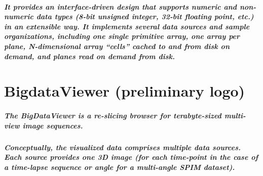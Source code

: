 \documentclass[
  letterpaper,
  DIV=11,
  numbers=noendperiod]{scrartcl}
\let\oldsubparagraph\subparagraph
\renewcommand{\subparagraph}[1]{\oldsubparagraph{#1}\mbox{}}
\begin{document}
\hypertarget{it-provides-an-interface-driven-design-that-supports-numeric-and-non-numeric-data-types-8-bit-unsigned-integer-32-bit-floating-point-etc.-in-an-extensible-way.-it-implements-several-data-sources-and-sample-organizations-including-one-single-primitive-array-one-array-per-plane-n-dimensional-array-cells-cached-to-and-from-disk-on-demand-and-planes-read-on-demand-from-disk.}{%
\subparagraph{It provides an interface-driven design that supports
numeric and non-numeric data types (8-bit unsigned integer, 32-bit
floating point, etc.) in an extensible way. It implements several data
sources and sample organizations, including one single primitive array,
one array per plane, N-dimensional array ``cells'' cached to and from
disk on demand, and planes read on demand from
disk.}\label{it-provides-an-interface-driven-design-that-supports-numeric-and-non-numeric-data-types-8-bit-unsigned-integer-32-bit-floating-point-etc.-in-an-extensible-way.-it-implements-several-data-sources-and-sample-organizations-including-one-single-primitive-array-one-array-per-plane-n-dimensional-array-cells-cached-to-and-from-disk-on-demand-and-planes-read-on-demand-from-disk.}}

\hypertarget{bigdataviewer-preliminary-logo}{%
\section{BigdataViewer (preliminary
logo)}\label{bigdataviewer-preliminary-logo}}

\hypertarget{the-bigdataviewer-is-a-re-slicing-browser-for-terabyte-sized-multi-view-image-sequences.}{%
\subparagraph{The BigDataViewer is a re-slicing browser for
terabyte-sized multi-view image
sequences.}\label{the-bigdataviewer-is-a-re-slicing-browser-for-terabyte-sized-multi-view-image-sequences.}}

\hypertarget{conceptually-the-visualized-data-comprises-multiple-data-sources.-each-source-provides-one-3d-image-for-each-time-point-in-the-case-of-a-time-lapse-sequence-or-angle-for-a-multi-angle-spim-dataset.}{%
\subparagraph{Conceptually, the visualized data comprises multiple data
sources. Each source provides one 3D image (for each time-point in the
case of a time-lapse sequence or angle for a multi-angle SPIM
dataset).}\label{conceptually-the-visualized-data-comprises-multiple-data-sources.-each-source-provides-one-3d-image-for-each-time-point-in-the-case-of-a-time-lapse-sequence-or-angle-for-a-multi-angle-spim-dataset.}}
\end{document}
